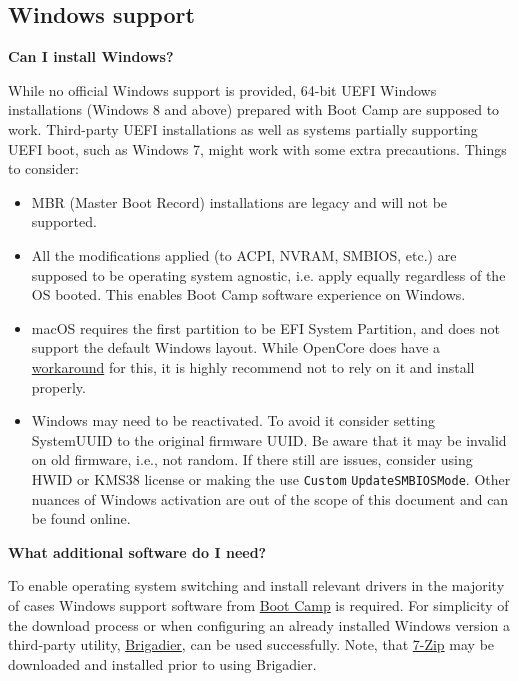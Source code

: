\documentclass[]{article}
\makeatletter
\renewcommand{\label}[1]{%
\zref@wrapper@immediate{\oldlabel{#1}}}  %
\makeatother
\begin{document}
\subsection{Windows support}\label{troubleshootingwin}

  \textbf{Can I install Windows?}

  While no official Windows support is provided, 64-bit UEFI Windows installations (Windows 8 and
  above) prepared with Boot Camp are supposed to work. Third-party UEFI installations
  as well as systems partially supporting UEFI boot, such as Windows 7, might work with
  some extra precautions. Things to consider:

  \begin{itemize}
  \item MBR (Master Boot Record) installations are legacy and will not be supported.
  \item All the modifications applied (to ACPI, NVRAM, SMBIOS, etc.) are supposed
  to be operating system agnostic, i.e. apply equally regardless of the OS booted.
  This enables Boot Camp software experience on Windows.
  \item macOS requires the first partition to be EFI System Partition, and does
  not support the default Windows layout. While OpenCore does have a
  \href{https://github.com/acidanthera/bugtracker/issues/327}{workaround}
  for this, it is highly recommend not to rely on it and install properly.
  \item Windows may need to be reactivated. To avoid it consider
  setting SystemUUID to the original firmware UUID. Be aware that it may be invalid
  on old firmware, i.e., not random. If there still are issues,
  consider using HWID or KMS38 license or making the use \texttt{Custom}
  \texttt{UpdateSMBIOSMode}. Other nuances of Windows activation are out of the
  scope of this document and can be found online.
  \end{itemize}

  \textbf{What additional software do I need?}

  To enable operating system switching and install relevant drivers in the majority of
  cases Windows support software from
  \href{https://support.apple.com/boot-camp}{Boot Camp} is required. For simplicity of the download
  process or when configuring an already installed Windows version a third-party utility,
  \href{https://github.com/timsutton/brigadier}{Brigadier}, can be used successfully.
  Note, that \href{https://www.7-zip.org}{7-Zip} may be downloaded and installed
  prior to using Brigadier.
\end{document}
